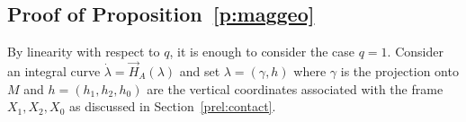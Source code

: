 \documentclass{amsart}
\theoremstyle{plain}
\newtheorem{proposition}[theorem]{Proposition}
\theoremstyle{definition}
\theoremstyle{remark}
\newcommand{\Tor}{\mathrm{Tor}}
\newcommand{\B}{\beta}
\begin{document}
\subsection{Proof of Proposition~\ref{p:maggeo}}
 By linearity with respect to $q$, it is enough to consider the case $q=1$. Consider  an integral curve $\dot \lambda=\vec H_{A}(\lambda)$ and set $\lambda=(\gamma,h)$ where $\gamma$ is the projection onto $M$ and  $h=(h_{1},h_{2},h_{0})$ are the vertical coordinates associated with the frame $X_{1},X_{2},X_{0}$ as discussed in Section~\ref{prel:contact}.
\end{document}
